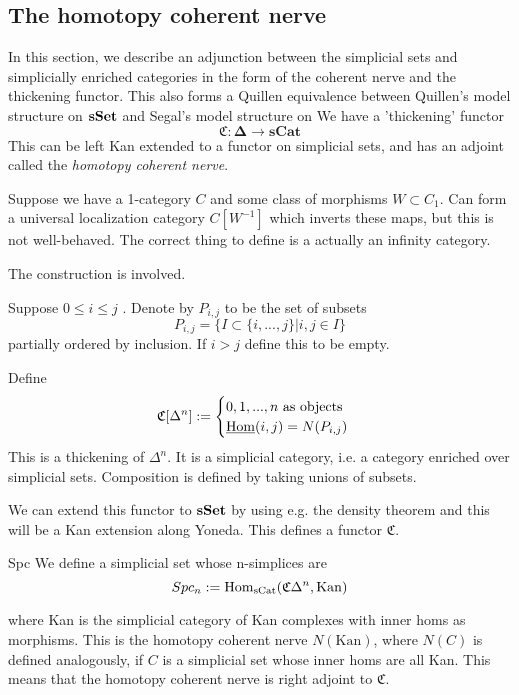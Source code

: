 \subsection{The homotopy coherent nerve}
In this section, we describe an adjunction between the simplicial sets and simplicially enriched categories in the form of the coherent nerve and the thickening functor. This also forms a Quillen equivalence between Quillen's model structure on $\operatorname{\mathbf{sSet}}$ and Segal's model structure on 
We have a 'thickening' functor $$\mathfrak{C}:\mathbf{\Delta}\rightarrow \mathbf{sCat}$$
This can be left Kan extended to a functor on simplicial sets, and has an adjoint called the \emph{homotopy coherent nerve}.

Suppose we have a 1-category $C$ and some class of morphisms $W\subset C_1$. Can form a universal localization category $C[W^{-1}]$ which inverts these maps, but this is not well-behaved. The correct thing to define is a actually an infinity category. 

The construction is involved.

Suppose $0\leq i\leq j$ . Denote by $P_{i,j}$ to be the set of subsets $$P_{i,j}=\{I\subset \{i,...,j\}| i,j\in I\}$$partially ordered by inclusion. If $i>j$ define this to be empty. 

Define $$\mathfrak{C}[\Delta^n]:=\begin{cases}0,1,...,n \text{ as objects}\\\underline{\operatorname{Hom}}(i,j)=N(P_{i,j}) \end{cases}$$This is a thickening of $\Delta^n$. It is a simplicial category, i.e. a category enriched over simplicial sets. Composition is defined by taking unions of subsets. 

We can extend this functor to $\operatorname{\mathbf{sSet}}$ by using e.g. the density theorem and this will be a Kan extension along Yoneda. This defines a functor $\mathfrak{C}$.


\begin{definition}{Spc}{}
    We define a simplicial set whose n-simplices are $$Spc _n:=\operatorname{Hom}_{\mathrm{sCat}}(\mathfrak{C}\Delta^n, \mathrm{Kan})$$
    
    where Kan is the simplicial category of Kan complexes with inner homs as morphisms. This is the homotopy coherent nerve $N(\mathrm{Kan})$, where $N(C)$ is defined analogously, if $C$ is a simplicial set whose inner homs are all Kan. This means that the homotopy coherent nerve is right adjoint to $\mathfrak{C}$. 
\end{definition}

